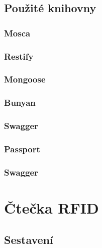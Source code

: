 \documentclass[czech,BP]{thesiskiv}
\begin{document}
	
		
	\section{Použité knihovny}
		\subsection{Mosca}
		\subsection{Restify}
		\subsection{Mongoose}
		\label{subsec:mongoose}		
		
		
		\subsection{Bunyan}
		\subsection{Swagger}
		\subsection{Passport}
		\subsection{Swagger}
		
	
\chapter{Čtečka RFID}


	
		






	\section{Sestavení}
		
\end{document}
